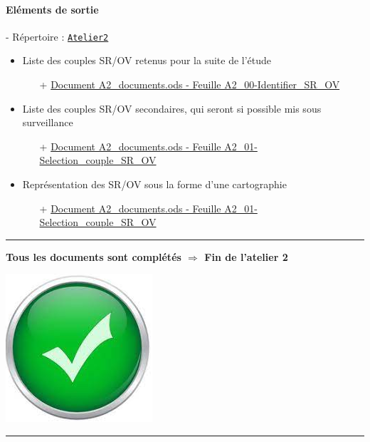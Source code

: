 \documentclass[french, 12pt]{article}%
\newcommand{\itemE}{\item[$\bullet$]}
\begin{document}
\paragraph{Eléments de sortie} - Répertoire : \href{run:./ressource_eleve/Atelier2/}{\verb?Atelier2?}
\begin{itemize}
	\itemE  Liste des couples SR/OV retenus pour la suite de l’étude
		\begin{itemize}
		\item[+] \href{run:./ressource_eleve/Atelier2/A2_documents.ods}{Document A2\_documents.ods - Feuille A2\_00-Identifier\_SR\_OV}
		\end{itemize}
	\itemE  Liste des couples SR/OV secondaires, qui seront si possible mis sous surveillance
		\begin{itemize}
		\item[+] \href{run:./ressource_eleve/Atelier2/A2_documents.ods}{Document A2\_documents.ods - Feuille A2\_01-Selection\_couple\_SR\_OV}
		\end{itemize}
	\itemE  Représentation des SR/OV sous la forme d’une cartographie
		\begin{itemize}
		\item[+] \href{run:./ressource_eleve/Atelier2/A2_documents.ods}{Document A2\_documents.ods - Feuille A2\_01-Selection\_couple\_SR\_OV}
		\end{itemize}
\end{itemize}

\vspace{0.5cm}
\begin{center}
 \rule{0.75\linewidth}{1pt}
\end{center}
\begin{minipage}[c]{0.59\linewidth}

\textbf{Tous les documents sont complétés $\Rightarrow$ Fin de l'atelier 2}
\end{minipage}
\begin{minipage}[c]{0.4\linewidth}
\begin{center}
\includegraphics[scale=0.1]{./ressource/OKLogo}
\end{center}
\end{minipage}
\begin{center}
 \rule{0.75\linewidth}{1pt}
\end{center}
\end{document}
